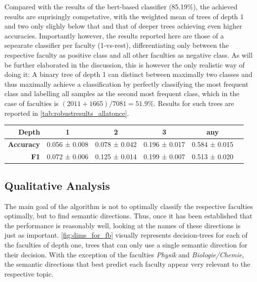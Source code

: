 Compared with the results of the \gls{bert}-based classifier (85.19\%), the achieved results are suprisingly competative, with the weighted mean of trees of depth 1 and two only slighly below that and that of deeper trees achieving even higher accuracies. Importantly however, the results reported here are those of a sepearate classifier per faculty (1-vs-rest), differentiating only between the respective faculty as positive class and all other faculties as negative class. As will be further elaborated in the discussion, this is however the only realistic way of doing it: A binary tree of depth 1 can distinct between maximally two classes and thus maximally achieve a classification by perfectly classifying the most frequent class and labelling all samples as the second most frequent class, which in the case of faculties is $(2011+1665)/7081=51.9\%$. Results for such trees are reported in \autoref{tab:robustresults_allatonce}.

\begin{table}[H]
	\begin{tabular}{rccccc}
		\toprule
		\textbf{Depth} &  \textbf{1} & \textbf{2} & \textbf{3} & \textbf{any} \\
		\midrule
		\textbf{Accuracy} & 0.056 ± 0.008 & 0.078 ± 0.042 & 0.196 ± 0.017 & 0.584 ± 0.015 \\
		\textbf{F1}       & 0.072 ± 0.006 & 0.125 ± 0.014 & 0.199 ± 0.007 & 0.513 ± 0.020 \\
		\bottomrule
	\end{tabular}
	\label{tab:robustresults_allatonce}
\end{table}


\subsection{Qualitative Analysis}

The main goal of the algorithm is not to optimally classify the respective faculties optimally, but to find semantic directions. Thus, once it has been established that the performance is reasonably well, looking at the names of these directions is just as important. \autoref{fig:dims_for_fb} visually represents decision-trees for each of the faculties of depth one, \ie trees that can only use a single semantic direction for their decision. With the exception of the faculties \emph{Physik} and \emph{Biologie/Chemie}, the semantic directions that best predict each faculty appear very relevant to the respective topic.

